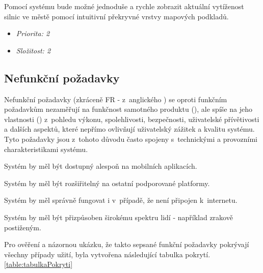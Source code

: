 Pomocí systému bude možné jednoduše a rychle zobrazit aktuální vytíženost silnic ve městě pomocí intuitivní překryvné vrstvy mapových podkladů.

\begin{itemize}
  \item \textit{Priorita: 2}
  \item \textit{Složitost: 2}
\end{itemize}

\subsection{Nefunkční požadavky}
Nefunkční požadavky (zkráceně FR - z~anglického ) se oproti funkčním požadavkům nezaměřují na funkčnost samotného produktu (),
ale spíše na jeho vlastnosti () z~pohledu
výkonu, spolehlivosti, bezpečnosti, uživatelské přívětivosti a dalších aspektů, které nepřímo ovlivňují uživatelský zážitek a kvalitu systému. 
Tyto požadavky jsou z~tohoto důvodu často spojeny s~technickými a provozními charakteristikami systému.

Systém by měl být dostupný alespoň na mobilních aplikacích.



Systém by měl být rozšiřitelný na ostatní podporované platformy. %

Systém by měl správně fungovat i v~případě, že není připojen k~internetu.

Systém by měl být přizpůsoben širokému spektru lidí - například zrakově postiženým.


Pro ověření a názornou ukázku, že takto sepsané funkční požadavky pokrývají všechny případy užití, 
byla vytvořena následující tabulka pokrytí. \ref{table:tabulkaPokryti}

